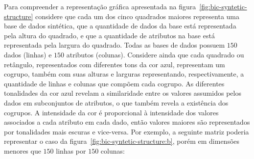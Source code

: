 \documentclass[
    12pt,                %
    oneside,            %
    a4paper,            %
    english,            %
    brazil                %
    ]{abntex2ppgsi}
\begin{document}

Para compreender a representação gráfica apresentada na figura~\ref{fig:bic-syntetic-structure} considere que cada um dos cinco quadrados maiores representa uma base de dados sintética, que a quantidade de dados da base está representada pela altura do quadrado, e que a quantidade de atributos na base está representada pela largura do quadrado.
Todas as bases de dados possuem $150$ dados (linhas) e $150$ atributos (colunas).
Considere ainda que cada quadrado ou retângulo, representados com diferentes tons da cor azul, representam um cogrupo, também com suas alturas e larguras representando, respectivamente, a quantidade de linhas e colunas que compõem cada cogrupo.
As diferentes tonalidades da cor azul revelam a similaridade entre os valores assumidos pelos dados em subconjuntos de atributos, o que também revela a existência dos cogrupos.
A intensidade da cor é proporcional à intensidade dos valores associados a cada atributo em cada dado, então valores maiores são representados por tonalidades mais escuras e vice-versa.
Por exemplo, a seguinte matriz poderia representar o caso da figura~\ref{fig:bic-syntetic-structure:b}, porém em dimensões menores que $150$ linhas por $150$ colunas:
\end{document}

